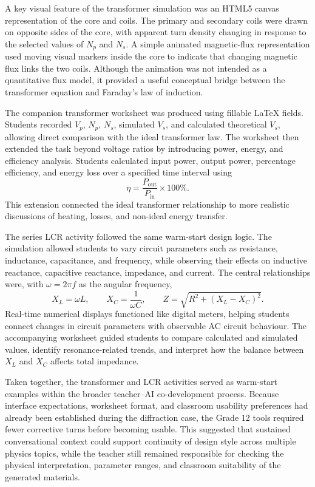 \documentclass{iopjournal}
\begin{document}
A key visual feature of the transformer simulation was an HTML5 canvas representation of the core and coils. The primary and secondary coils were drawn on opposite sides of the core, with apparent turn density changing in response to the selected values of $N_p$ and $N_s$. A simple animated magnetic-flux representation used moving visual markers inside the core to indicate that changing magnetic flux links the two coils. Although the animation was not intended as a quantitative flux model, it provided a useful conceptual bridge between the transformer equation and Faraday's law of induction.

The companion transformer worksheet was produced using fillable \LaTeX{} fields. Students recorded $V_p$, $N_p$, $N_s$, simulated $V_s$, and calculated theoretical $V_s$, allowing direct comparison with the ideal transformer law. The worksheet then extended the task beyond voltage ratios by introducing power, energy, and efficiency analysis. Students calculated input power, output power, percentage efficiency, and energy loss over a specified time interval using
\begin{equation}
\eta = \frac{P_{\mathrm{out}}}{P_{\mathrm{in}}}\times 100\% .
\end{equation}
This extension connected the ideal transformer relationship to more realistic discussions of heating, losses, and non-ideal energy transfer.

The series LCR activity followed the same warm-start design logic. The simulation allowed students to vary circuit parameters such as resistance, inductance, capacitance, and frequency, while observing their effects on inductive reactance, capacitive reactance, impedance, and current. The central relationships were, with $\omega=2\pi f$ as the angular frequency,
\begin{equation}
X_L=\omega L, \qquad X_C=\frac{1}{\omega C}, \qquad Z=\sqrt{R^2+(X_L-X_C)^2}.
\end{equation}
Real-time numerical displays functioned like digital meters, helping students connect changes in circuit parameters with observable AC circuit behaviour. The accompanying worksheet guided students to compare calculated and simulated values, identify resonance-related trends, and interpret how the balance between $X_L$ and $X_C$ affects total impedance.


Taken together, the transformer and LCR activities served as warm-start examples within the broader teacher--AI co-development process. Because interface expectations, worksheet format, and classroom usability preferences had already been established during the diffraction case, the Grade 12 tools required fewer corrective turns before becoming usable. This suggested that sustained conversational context could support continuity of design style across multiple physics topics, while the teacher still remained responsible for checking the physical interpretation, parameter ranges, and classroom suitability of the generated materials.
\end{document}
